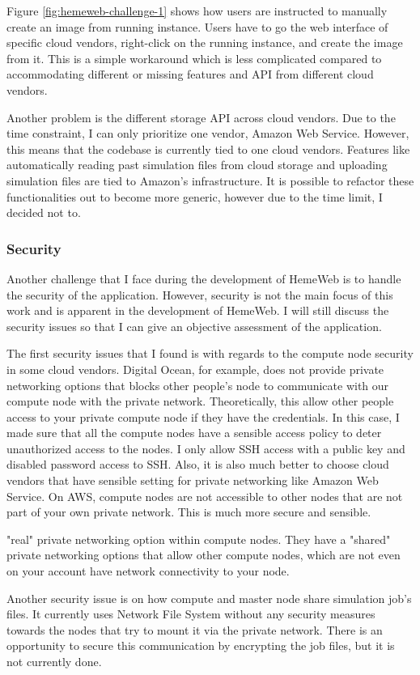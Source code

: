 \vspace{1cm}

Figure \ref{fig:hemeweb-challenge-1} shows how users are instructed to manually create an image from running instance. Users have to go the web interface of specific cloud vendors, right-click on the running instance, and create the image from it. This is a simple workaround which is less complicated compared to accommodating different or missing features and API from different cloud vendors.


Another problem is the different storage API across cloud vendors. Due to the time constraint, I can only prioritize one vendor, Amazon Web Service. However, this means that the codebase is currently tied to one cloud vendors. Features like automatically reading past simulation files from cloud storage and uploading simulation files are tied to Amazon's infrastructure. It is possible to refactor these functionalities out to become more generic, however due to the time limit, I decided not to.

\subsubsection{Security}

Another challenge that I face during the development of HemeWeb is to handle the security of the application. However, security is not the main focus of this work and is apparent in the development of HemeWeb. I will still discuss the security issues so that I can give an objective assessment of the application.

The first security issues that I found is with regards to the compute node security in some cloud vendors. Digital Ocean, for example, does not provide private networking options that blocks other people's node to communicate with our compute node with the private network. Theoretically, this allow other people access to your private compute node if they have the credentials. In this case, I made sure that all the compute nodes have a sensible access policy to deter unauthorized access to the nodes. I only allow SSH access with a public key and disabled password access to SSH. Also, it is also much better to choose cloud vendors that have sensible setting for private networking like Amazon Web Service. On AWS, compute nodes are not accessible to other nodes that are not part of your own private network. This is much more secure and sensible.


"real" private networking option within compute nodes. They have a "shared" private networking options that allow other compute nodes, which are not even on your account have network connectivity to your node. 


Another security issue is on how compute and master node share simulation job's files. It currently uses Network File System without any security measures towards the nodes that try to mount it via the private network. There is an opportunity to secure this communication by encrypting the job files, but it is not currently done.






